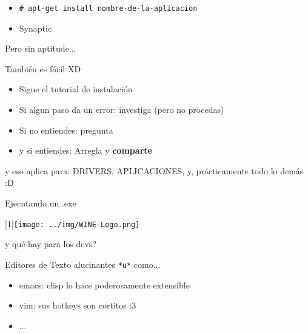 \documentclass[xcolor=dvipsnames, pdf]{beamer}
\begin{document}
\begin{section}
\begin{subsection}
\begin{subsection}
\begin{frame}
        \begin{itemize}
        \item \texttt{\#{} apt-get install nombre-de-la-aplicacion}
        \item Synaptic
        \end{itemize}
      \end{frame}
      

      \begin{frame}
        {Pero sin aptitude...}
        
        Tambi\'{e}n es f\'{a}cil XD
        
        \begin{itemize}
        \item Sigue el tutorial de instalaci\'{o}n
        \item Si algun paso da un error: investiga \alert{(pero no procedas)}
        \item Si no entiendes: pregunta
        \item y si entiendes: Arregla y \textbf{comparte}
        \end{itemize}
        \pause
        y eso aplica para: \color[rgb]{0.8,0.3,0.3} DRIVERS,
        \color[rgb]{0.3,0.8,0.3} APLICACIONES, 
        \color[rgb]{0.3,0.3,0.8} y, pr\'{a}cticamente todo lo dem\'{a}s :D
      \end{frame}

      \begin{frame}
        {Ejecutando un .exe}
        \begin{center}
          \scalebox{-1}[1]{\texttt{[image: ../img/WINE-Logo.png]}}
        \end{center}
      \end{frame}
    \end{subsection}


    \begin{subsection}
      {y qu\'{e} hay para los devs?}
      
      \begin{frame}
        {Editores de Texto alucinantes \texttt{*u*}}
        como...
        \begin{itemize}
        \item emacs: elisp lo hace poderosamente extensible
        \item vim: sus hotkeys son cortitos :3 
        \item ...
        \end{itemize}
      \end{frame}



\end{subsection}
\end{subsection}
\end{section}
\end{document}
